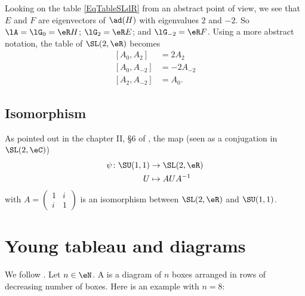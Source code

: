 Looking on the table \eqref{EqTableSLdR} from an abstract point of view, we see that $E$ and $F$ are eigenvectors of $\ad(H)$ with eigenvalues $2$ and $-2$. So $\lA=\lG_0=\eR H$; $\lG_2=\eR E$; and $\lG_{-2}=\eR F$. Using a more abstract notation, the table of $\SL(2,\eR)$ becomes
\begin{subequations}  \label{subeq_rootSLR}
\begin{align}
  [A_{0},A_{2}]&=2A_{2}\\
	[A_{0},A_{-2}]&=-2A_{-2}\\
	[A_{2},A_{-2}]&=A_{0}.
\end{align}
\end{subequations}

\subsection{Isomorphism}

As pointed out in the chapter II, \S6 of \cite{Knapp_reprez}, the map (seen as a conjugation in $\SL(2,\eC)$)
\begin{equation}
	\begin{aligned}
		\psi\colon \SU(1,1)&\to \SL(2,\eR) \\ 
		U&\mapsto AUA^{-1} 
	\end{aligned}
\end{equation}
with $A=\begin{pmatrix}
1&i\\i&1
\end{pmatrix}$ is an isomorphism between $\SL(2,\eR)$ and $\SU(1,1)$.

					\section{Young tableau and diagrams}

We follow \cite{ModavePoincarre}. Let $n\in \eN$. A  is a diagram of $n$ boxes arranged in rows of decreasing number of boxes. Here is an example with $n=8$:
%	

\begin{center}
   
\end{center}


